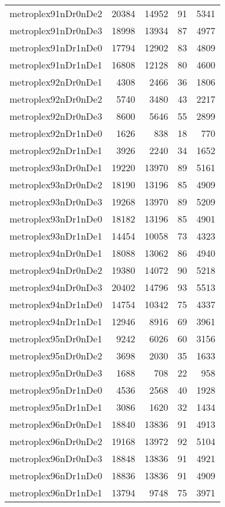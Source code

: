 \begin{tabular}{lrrrr}
metroplex91nDr0nDe2 & 20384 & 14952 & 91 & 5341 \\
metroplex91nDr0nDe3 & 18998 & 13934 & 87 & 4977 \\
metroplex91nDr1nDe0 & 17794 & 12902 & 83 & 4809 \\
metroplex91nDr1nDe1 & 16808 & 12128 & 80 & 4600 \\
metroplex92nDr0nDe1 & 4308 & 2466 & 36 & 1806 \\
metroplex92nDr0nDe2 & 5740 & 3480 & 43 & 2217 \\
metroplex92nDr0nDe3 & 8600 & 5646 & 55 & 2899 \\
metroplex92nDr1nDe0 & 1626 & 838 & 18 & 770 \\
metroplex92nDr1nDe1 & 3926 & 2240 & 34 & 1652 \\
metroplex93nDr0nDe1 & 19220 & 13970 & 89 & 5161 \\
metroplex93nDr0nDe2 & 18190 & 13196 & 85 & 4909 \\
metroplex93nDr0nDe3 & 19268 & 13970 & 89 & 5209 \\
metroplex93nDr1nDe0 & 18182 & 13196 & 85 & 4901 \\
metroplex93nDr1nDe1 & 14454 & 10058 & 73 & 4323 \\
metroplex94nDr0nDe1 & 18088 & 13062 & 86 & 4940 \\
metroplex94nDr0nDe2 & 19380 & 14072 & 90 & 5218 \\
metroplex94nDr0nDe3 & 20402 & 14796 & 93 & 5513 \\
metroplex94nDr1nDe0 & 14754 & 10342 & 75 & 4337 \\
metroplex94nDr1nDe1 & 12946 & 8916 & 69 & 3961 \\
metroplex95nDr0nDe1 & 9242 & 6026 & 60 & 3156 \\
metroplex95nDr0nDe2 & 3698 & 2030 & 35 & 1633 \\
metroplex95nDr0nDe3 & 1688 & 708 & 22 & 958 \\
metroplex95nDr1nDe0 & 4536 & 2568 & 40 & 1928 \\
metroplex95nDr1nDe1 & 3086 & 1620 & 32 & 1434 \\
metroplex96nDr0nDe1 & 18840 & 13836 & 91 & 4913 \\
metroplex96nDr0nDe2 & 19168 & 13972 & 92 & 5104 \\
metroplex96nDr0nDe3 & 18848 & 13836 & 91 & 4921 \\
metroplex96nDr1nDe0 & 18836 & 13836 & 91 & 4909 \\
metroplex96nDr1nDe1 & 13794 & 9748 & 75 & 3971 \\

\end{tabular}
